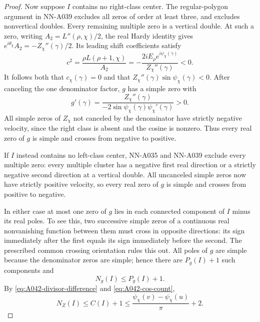 \begin{proof}
Now suppose $I$ contains no right-class center. The regular-polygon
argument in NN-A039 excludes all zeros of order at least three,
and excludes nonvertical doubles. Every remaining multiple zero
is a vertical double. At such a zero, writing
$A_2=L''(\rho,\chi)/2$, the real Hardy identity gives
$e^{i\theta_\chi}A_2=-Z_\chi''(\gamma)/2$. Its leading shift
coefficients satisfy
\[
 c^2=\frac{\rho L(\rho+1,\chi)}{A_2}
      =-\frac{2iE_\rho e^{i\psi_\chi(\gamma)}}{Z_\chi''(\gamma)}
                      <0.
\]
It follows both that $c_\chi(\gamma)=0$ and that
$Z_\chi''(\gamma)\sin\psi_\chi(\gamma)<0$.
After canceling the one denominator factor, $g$ has a simple
zero with
\begin{equation}\label{eq:A042-double-crossing}
 g'(\gamma)=
 \frac{Z_\chi''(\gamma)}{-2\sin\psi_\chi(\gamma)
                                  \psi_\chi'(\gamma)}>0.
\end{equation}
All simple zeros of $Z_\chi$ not canceled by the denominator
have strictly negative velocity, since the right class is absent
and the cosine is nonzero. Thus every real zero of $g$ is simple
and crosses from negative to positive.

If $I$ instead contains no left-class center, NN-A035 and
NN-A039 exclude every multiple zero: every multiple cluster
has a negative first real direction or a strictly negative
second direction at a vertical double. All uncanceled simple
zeros now have strictly positive velocity, so every real zero
of $g$ is simple and crosses from positive to negative.

In either case at most one zero of $g$ lies in each connected
component of $I$ minus its real poles. To see this, two successive
simple zeros of a continuous real nonvanishing function between
them must cross in opposite directions: its sign immediately
after the first equals its sign immediately before the second.
The prescribed common crossing orientation rules this out.
All poles of $g$ are simple because the denominator zeros are
simple; hence there are $P_g(I)+1$ such components and
\[
                       N_g(I)\le P_g(I)+1.
\]
By \eqref{eq:A042-divisor-difference} and
\eqref{eq:A042-cos-count},
\begin{equation}\label{eq:A042-overcrowding}
 N_Z(I)\le C(I)+1
          \le\frac{\psi_\chi(v)-\psi_\chi(u)}\pi+2.
\end{equation}


\end{proof}
